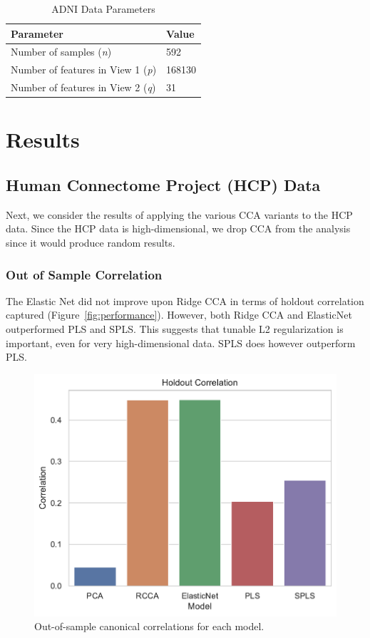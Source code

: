 \begin{table}
\centering
\caption{ADNI Data Parameters}
\begin{tabular}{| l | l |}
\hline
\textbf{Parameter} & \textbf{Value} \\
\hline
Number of samples (\textit{n}) & 592 \\
Number of features in View 1 (\textit{p}) & 168130 \\
Number of features in View 2 (\textit{q}) & 31 \\
\hline
\end{tabular}\label{tab:adni-parameters}
\end{table}

\section{Results}

\subsection{Human Connectome Project (HCP) Data}

Next, we consider the results of applying the various CCA variants to the HCP data.
Since the HCP data is high-dimensional, we drop CCA from the analysis since it would produce random results.

\subsubsection{Out of Sample Correlation}

The Elastic Net did not improve upon Ridge CCA in terms of holdout correlation captured (Figure~\ref{fig:performance}).
However, both Ridge CCA and ElasticNet outperformed PLS and SPLS.
This suggests that tunable L2 regularization is important, even for very high-dimensional data.
SPLS does however outperform PLS.

\begin{figure}
\centering
\includegraphics[width=0.5\linewidth]{figures/hcp/holdout_correlations}
\caption{Out-of-sample canonical correlations for each model.}
\end{figure}

